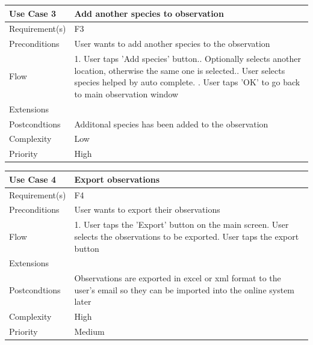 \begin{tabular}[t]{|l|p{}|}\hline
	Use Case 3&Add another species to observation\\\hline
	Requirement(s)&F3\\\hline
	Preconditions&User wants to add another species to the observation\\\hline
	Flow&1. User taps 'Add species' button.\newline
	2. Optionally selects another location, otherwise the same one is selected.\newline
	3. User selects species helped by auto complete. \newline
	4. User taps 'OK' to go back to main observation window \\\hline
	Extensions& \\\hline
	Postcondtions&Additonal species has been added to the observation\\\hline
	Complexity&Low\\\hline
	Priority&High\\\hline
\end{tabular}

\hspace{2em}

\begin{tabular}[t]{|l|p{}|}\hline
	Use Case 4&Export  observations\\\hline
	Requirement(s)&F4\\\hline
	Preconditions& User wants to export their observations \\\hline
	Flow&1. User taps the 'Export' button on the main screen\newline
	2. User selects the observations to be exported\newline
	3. User taps the export button\\\hline
	Extensions& \\\hline
	Postcondtions&Observations are exported in excel or xml format to the user's email so they can be imported into the online system later\\\hline
	Complexity&High\\\hline
	Priority&Medium\\\hline
\end{tabular}

\hspace{2em}

